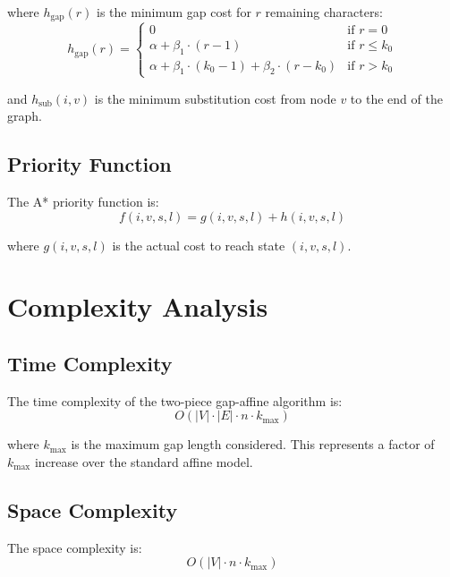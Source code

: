 \documentclass[11pt]{article}
\begin{document}
where $h_{\text{gap}}(r)$ is the minimum gap cost for $r$ remaining characters:
\begin{equation}
h_{\text{gap}}(r) = \begin{cases}
0 & \text{if } r = 0 \\
\alpha + \beta_1 \cdot (r-1) & \text{if } r \leq k_0 \\
\alpha + \beta_1 \cdot (k_0-1) + \beta_2 \cdot (r-k_0) & \text{if } r > k_0
\end{cases}
\end{equation}

and $h_{\text{sub}}(i, v)$ is the minimum substitution cost from node $v$ to the end of the graph.

\subsection{Priority Function}

The A* priority function is:
\begin{equation}
f(i, v, s, l) = g(i, v, s, l) + h(i, v, s, l)
\end{equation}

where $g(i, v, s, l)$ is the actual cost to reach state $(i, v, s, l)$.

\section{Complexity Analysis}

\subsection{Time Complexity}

The time complexity of the two-piece gap-affine algorithm is:
\begin{equation}
O(|V| \cdot |E| \cdot n \cdot k_{\max})
\end{equation}

where $k_{\max}$ is the maximum gap length considered. This represents a factor of $k_{\max}$ increase over the standard affine model.

\subsection{Space Complexity}

The space complexity is:
\begin{equation}
O(|V| \cdot n \cdot k_{\max})
\end{equation}
\end{document}
